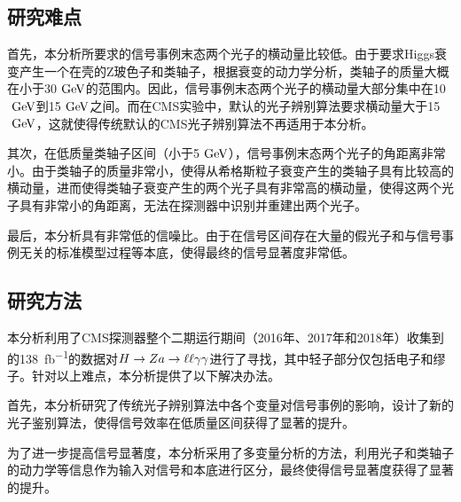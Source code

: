 \subsection{研究难点}

首先，本分析所要求的信号事例末态两个光子的横动量比较低。由于要求Higgs衰变产生一个在壳的Z玻色子和类轴子，根据衰变的动力学分析，类轴子的质量大概在小于30$\GeV$的范围内。因此，信号事例末态两个光子的横动量大部分集中在10$\GeV$到15$\GeV$之间。而在CMS实验中，默认的光子辨别算法要求横动量大于15$\GeV$，这就使得传统默认的CMS光子辨别算法不再适用于本分析。

其次，在低质量类轴子区间（小于5$\GeV$），信号事例末态两个光子的角距离非常小。由于类轴子的质量非常小，使得从希格斯粒子衰变产生的类轴子具有比较高的横动量，进而使得类轴子衰变产生的两个光子具有非常高的横动量，使得这两个光子具有非常小的角距离，无法在探测器中识别并重建出两个光子。

最后，本分析具有非常低的信噪比。由于在信号区间存在大量的假光子和与信号事例无关的标准模型过程等本底，使得最终的信号显著度非常低。

\subsection{研究方法}

本分析利用了CMS探测器整个二期运行期间（2016年、2017年和2018年）收集到的138~\si{fb^{-1}}的数据对$H\to Za\to\ell\ell\gamma\gamma$进行了寻找，其中轻子部分仅包括电子和缪子。针对以上难点，本分析提供了以下解决办法。

首先，本分析研究了传统光子辨别算法中各个变量对信号事例的影响，设计了新的光子鉴别算法，使得信号效率在低质量区间获得了显著的提升。

为了进一步提高信号显著度，本分析采用了多变量分析的方法，利用光子和类轴子的动力学等信息作为输入对信号和本底进行区分，最终使得信号显著度获得了显著的提升。

